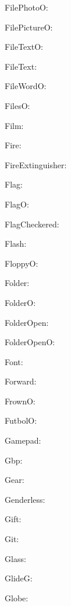 \documentclass{article}
\begin{document}
      FilePhotoO: \faFilePhotoO\ 

      FilePictureO: \faFilePictureO\ 

      FileTextO: \faFileTextO\ 

      FileText: \faFileText\ 

      FileWordO: \faFileWordO\ 

      FilesO: \faFilesO\ 

      Film: \faFilm\ 

      Fire: \faFire\ 

      FireExtinguisher: \faFireExtinguisher\ 

      Flag: \faFlag\ 

      FlagO: \faFlagO\ 

      FlagCheckered: \faFlagCheckered\ 

      Flash: \faFlash\ 

      FloppyO: \faFloppyO\ 

      Folder: \faFolder\ 

      FolderO: \faFolderO\ 

      FolderOpen: \faFolderOpen\ 

      FolderOpenO: \faFolderOpenO\ 

      Font: \faFont\ 

      Forward: \faForward\ 

      FrownO: \faFrownO\ 

      FutbolO: \faFutbolO\ 

      Gamepad: \faGamepad\ 

      Gbp: \faGbp\ 

      Gear: \faGear\ 

      Genderless: \faGenderless\ 

      Gift: \faGift\ 

      Git: \faGit\ 

      Glass: \faGlass\ 

      GlideG: \faGlideG\ 

      Globe: \faGlobe\ 
\end{document}
